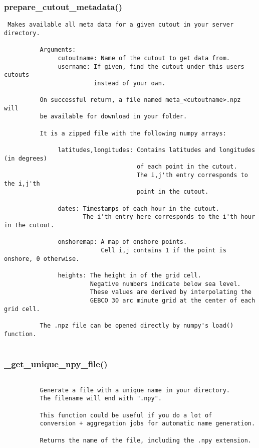 \subsubsection{prepare\_cutout\_metadata()}


\begin{verbatim}
 Makes available all meta data for a given cutout in your server directory.
          
          Arguments:
               cutoutname: Name of the cutout to get data from.
               username: If given, find the cutout under this users cutouts
                         instead of your own.
          
          On successful return, a file named meta_<cutoutname>.npz will
          be available for download in your folder.

          It is a zipped file with the following numpy arrays:

               latitudes,longitudes: Contains latitudes and longitudes (in degrees)
                                     of each point in the cutout.
                                     The i,j'th entry corresponds to the i,j'th
                                     point in the cutout.

               dates: Timestamps of each hour in the cutout.
                      The i'th entry here corresponds to the i'th hour in the cutout. 

               onshoremap: A map of onshore points.
                           Cell i,j contains 1 if the point is onshore, 0 otherwise.

               heights: The height in of the grid cell.
                        Negative numbers indicate below sea level.
                        These values are derived by interpolating the
                        GEBCO 30 arc minute grid at the center of each grid cell.

          The .npz file can be opened directly by numpy's load() function.
          
\end{verbatim}
\subsubsection{\_get\_unique\_npy\_file()}


\begin{verbatim}

          Generate a file with a unique name in your directory.
          The filename will end with ".npy".
          
          This function could be useful if you do a lot of
          conversion + aggregation jobs for automatic name generation.

          Returns the name of the file, including the .npy extension. 
\end{verbatim}
